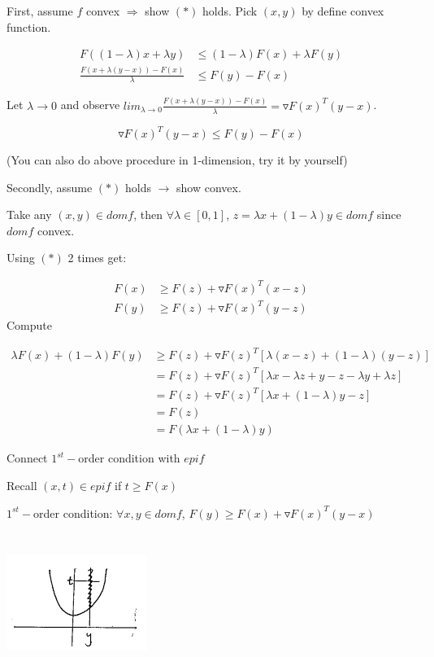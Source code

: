 First, assume $f$ convex $\Rightarrow$ show $(*)$ holds. Pick $(x,y)$ by define convex function. 

\begin{align*}
F((1-\lambda)x+\lambda y) &\leq (1-\lambda)F(x) + \lambda F(y)\\
\frac{F(x+\lambda(y-x)) - F(x)}{\lambda} &\leq F(y) - F(x)
\end{align*}


Let $\lambda \rightarrow 0$ and observe $lim_{\lambda\rightarrow 0} \frac{F(x+\lambda(y-x)) - F(x)}{\lambda} = \triangledown F(x)^T(y-x)$.

\begin{equation*}
\triangledown F(x)^T(y-x)\leq F(y) - F(x)
\end{equation*}

(You can also do above procedure in 1-dimension, try it by yourself)

Secondly, assume $(*)$ holds $\rightarrow$ show convex.

Take any $(x,y)\in domf$, then $\forall \lambda\in[0,1]$, $z= \lambda x + (1-\lambda)y \in domf$ since $domf$ convex.

Using $(*)$ 2 times get:

\begin{align*}
F(x) &\geq F(z) + \triangledown F(x)^T(x-z)\\
F(y) &\geq F(z) + \triangledown F(x)^T(y-z)
\end{align*} 
Compute

\begin{align*}
\lambda F(x)+(1-\lambda)F(y) &\geq F(z) + \triangledown F(z)^T[\lambda (x-z)+(1-\lambda)(y-z)]\\
&= F(z) + \triangledown F(z)^T[\lambda x - \lambda z + y - z - \lambda y +\lambda z]\\
&= F(z) + \triangledown F(z)^T[\lambda x + (1-\lambda)y - z]\\
&= F(z)\\
&= F(\lambda x + (1-\lambda )y)
\end{align*}

Connect $1^{st}-$order condition with $epif$

Recall $(x,t)\in epif$ if $t\geq F(x)$

$1^{st}-$order condition: $\forall x,y \in domf$, $F(y)\geq F(x) + \triangledown F(x)^T(y-x)$

\begin{marginfigure}
	\centering
	\includegraphics[width=1.8in,height=1.8in]{figures/ch08/figure1106_2.png}
\end{marginfigure}

